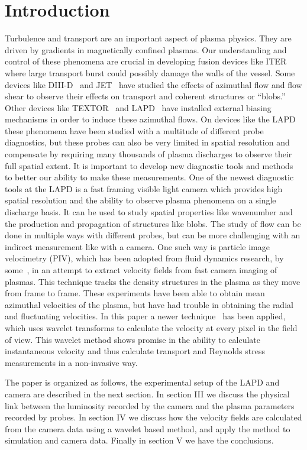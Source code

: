 \documentclass[%
 reprint,
 amsmath,amssymb,
 aps,
]{revtex4-1}
\begin{document}
\section{\label{sec:level1}Introduction}
Turbulence and transport are an important aspect of plasma physics. They are driven by gradients in magnetically confined plasmas. Our understanding and control of these phenomena are crucial in developing fusion devices like ITER where large transport burst could possibly damage the walls of the vessel. Some devices like DIII-D~\cite{mckee03} and JET~\cite{xu09} have studied the effects of azimuthal flow and flow shear to observe their effects on transport and coherent structures or “blobs.” Other devices like TEXTOR~\cite{jachmich98} and LAPD~\cite{Carter09,schaffner12,schaffner13} have installed external biasing mechanisms in order to induce these azimuthal flows. On devices like the LAPD these phenomena have been studied with a multitude of different probe diagnostics, but these probes can also be very limited in spatial resolution and compensate by requiring many thousands of plasma discharges to observe their full spatial extent. It is important to develop new diagnostic tools and methods to better our ability to make these measurements. One of the newest diagnostic tools at the LAPD is a fast framing visible light camera which provides high spatial resolution and the ability to observe plasma phenomena on a single discharge basis. It can be used to study spatial properties like wavenumber and the production and propagation of structures like blobs. The study of flow can be done in multiple ways with different probes, but can be more challenging with an indirect measurement like with a camera. One such way is particle image velocimetry (PIV), which has been adopted from fluid dynamics research, by some~\cite{oldenburger10}, in an attempt to extract velocity fields from fast camera imaging of plasmas. This technique tracks the density structures in the plasma as they move from frame to frame. These experiments have been able to obtain mean azimuthal velocities of the plasma, but have had trouble in obtaining the radial and fluctuating velocities. In this paper a newer technique~\cite{chaston10} has been applied, which uses wavelet transforms to calculate the velocity at every pixel in the field of view. This wavelet method shows promise in the ability to calculate instantaneous velocity and thus calculate transport and Reynolds stress measurements in a non-invasive way.

The paper is organized as follows, the experimental setup of the LAPD and camera are described in the next section. In section III we discuss the physical link between the luminosity recorded by the camera and the plasma parameters recorded by probes. In section IV we discuss how the velocity fields are calculated from the camera data using a wavelet based method, and apply the method to simulation and camera data. Finally in section V we have the conclusions.
\end{document}
